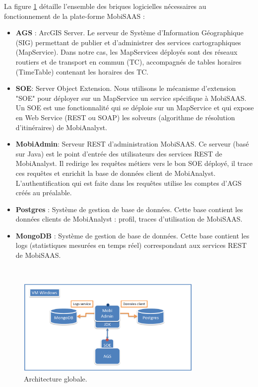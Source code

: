 La figure \ref{fig:architecture} détaille l'ensemble des briques logicielles nécessaires au fonctionnement de la plate-forme MobiSAAS :
\begin{itemize}
\item \textbf{AGS} : ArcGIS Server. Le serveur de Système d'Information Géographique (SIG) permettant de publier et d'administrer des services cartographiques (MapService).
Dans notre cas, les MapServices déployés sont des réseaux routiers et de transport en commun (TC), accompagnés de tables horaires (TimeTable) contenant les horaires des TC.
\item \textbf{SOE}: Server Object Extension. Nous utilisons le mécanisme d'extension "SOE" pour déployer sur un MapService un service spécifique à MobiSAAS. Un SOE est une fonctionnalité qui se déploie sur un MapService et qui expose en Web Service (REST ou SOAP) les solveurs (algorithme de résolution d'itinéraires) de MobiAnalyst.
\item \textbf{MobiAdmin}: Serveur REST d'administration MobiSAAS. Ce serveur (basé sur Java) est le point d'entrée des utilisateurs des services REST de MobiAnalyst.
Il redirige les requêtes métiers vers le bon SOE déployé, il trace ces requêtes et enrichit la base de données client de MobiAnalyst.
L'authentification qui est faite dans les requêtes utilise les comptes d'AGS créés au préalable.
\item \textbf{Postgres} : Système de gestion de base de données. Cette base contient les données clients de MobiAnalyst : profil, traces d'utilisation de MobiSAAS.
\item \textbf{MongoDB} : Système de gestion de base de données. Cette base contient les logs (statistiques mesurées en temps réel) correspondant aux services REST de MobiSAAS.
\end{itemize}
\\
\begin{figure}[h]
	\centering
		\includegraphics[width=0.8\textwidth]{images/architecture.png}
	\caption{Architecture globale.}
	\label{fig:architecture}
\end{figure}\\

